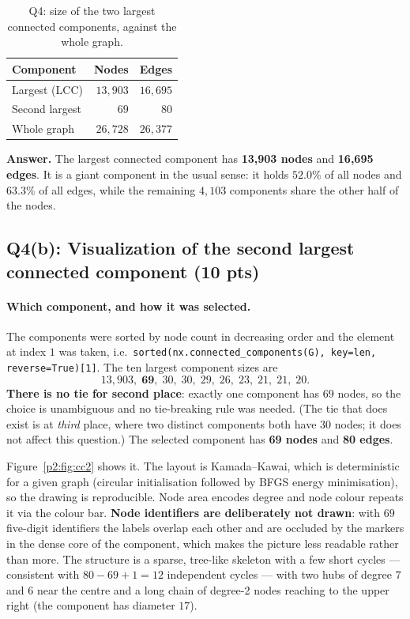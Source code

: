 \begin{table}[ht]
  \centering
  \begin{tabular}{lrr}
    \toprule
    Component & Nodes & Edges \\
    \midrule
    Largest (LCC)        & $13{,}903$ & $16{,}695$ \\
    Second largest       & $69$       & $80$       \\
    \midrule
    Whole graph          & $26{,}728$ & $26{,}377$ \\
    \bottomrule
  \end{tabular}
  \caption{Q4: size of the two largest connected components, against the whole
  graph.}
  \label{p2:tab:q4}
\end{table}

\noindent\textbf{Answer.} The largest connected component has
\textbf{13{,}903 nodes} and \textbf{16{,}695 edges}. It is a giant component in
the usual sense: it holds $52.0\%$ of all nodes and $63.3\%$ of all edges, while
the remaining $4{,}103$ components share the other half of the nodes.

\subsection*{Q4(b): Visualization of the second largest connected component (10 pts)}

\paragraph{Which component, and how it was selected.}
The components were sorted by node count in decreasing order and the element at
index $1$ was taken, i.e.\ \texttt{sorted(nx.connected\_components(G),
key=len, reverse=True)[1]}. The ten largest component sizes are
\[
  13{,}903,\; \mathbf{69},\; 30,\; 30,\; 29,\; 26,\; 23,\; 21,\; 21,\; 20 .
\]
\textbf{There is no tie for second place}: exactly one component has $69$ nodes,
so the choice is unambiguous and no tie-breaking rule was needed. (The tie that
does exist is at \emph{third} place, where two distinct components both have
$30$ nodes; it does not affect this question.) The selected component has
\textbf{69 nodes} and \textbf{80 edges}.

Figure~\ref{p2:fig:cc2} shows it. The layout is Kamada--Kawai, which is
deterministic for a given graph (circular initialisation followed by
BFGS energy minimisation), so the drawing is reproducible. Node area encodes
degree and node colour repeats it via the colour bar. \textbf{Node identifiers
are deliberately not drawn}: with $69$ five-digit identifiers the labels overlap
each other and are occluded by the markers in the dense core of the component,
which makes the picture less readable rather than more. The structure is a
sparse, tree-like skeleton with a few short cycles --- consistent with
$80-69+1 = 12$ independent cycles --- with two hubs of degree $7$ and $6$ near
the centre and a long chain of degree-2 nodes reaching to the upper right (the
component has diameter $17$).


